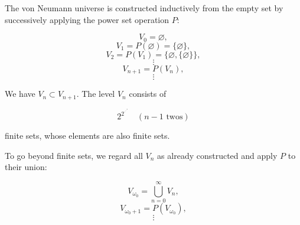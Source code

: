 The von Neumann universe is constructed inductively from the empty set by successively applying the power set operation $P$:

$$V_0 = \varnothing,$$
$$V_1 = P(\varnothing) = \{\varnothing\},$$
$$V_2 = P(V_1) = \{\varnothing, \{\varnothing\}\},$$
$$\vdots$$
$$V_{n+1} = P(V_n),$$
$$\vdots$$

We have $V_n \subset V_{n+1}$. The level $V_n$ consists of

$$2^{2^{\cdot^{\cdot^{\cdot^{2}}}}} \quad (n-1 \text{ twos})$$

finite sets, whose elements are also finite sets.

To go beyond finite sets, we regard all $V_n$ as already constructed and apply $P$ to their union:

$$V_{\omega_0} = \bigcup_{n=0}^{\infty} V_n,$$
$$V_{\omega_0 + 1} = P(V_{\omega_0}),$$
$$\vdots$$
